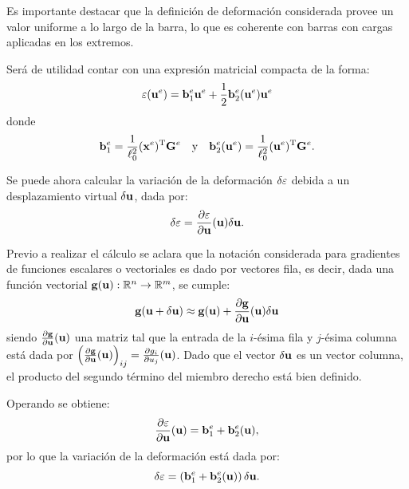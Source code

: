 Es importante destacar que la definición de deformación considerada provee un valor uniforme a lo largo de la barra, lo que es coherente con barras con cargas aplicadas en los extremos. %
%


Será de utilidad contar con una expresión matricial compacta de la forma:
%
\begin{equation}
\varepsilon ({\bf u}^e) = {\bf b}^e_1 {\bf u}^e +  \frac{1}{2} {\bf b}_{2}^e({\bf u}^e) {\bf u}^e
\end{equation}
%
donde
%
\begin{equation}\label{eqn:exprbs}
{\bf b}^e_1 =  \frac{1}{\ell_0^2} 
({\bf x}^e)^{\text{T}} {\bf G}^e
\quad
\text{y}
\quad
{\bf b}^e_2 ({\bf u}^e) = \frac{1}{\ell_0^2}  ({\bf u}^e)^{\text{T}} {\bf G}^e.
\end{equation}



Se puede ahora calcular la variación de la deformación $\delta\varepsilon$ debida a un desplazamiento virtual $\delta{\bf u}$, dada por:
%
\begin{equation}
\delta \varepsilon =  \frac{\partial \varepsilon}{\partial {\bf u}}({\bf u}) \delta {\bf u}.
\end{equation}

Previo a realizar el cálculo se aclara que la notación considerada para gradientes de funciones escalares o vectoriales es dado por vectores fila, es decir, dada una función vectorial ${\bf g}({\bf u}) :{\mathbb R}^n \rightarrow {\mathbb R}^m $, se cumple:
%
\begin{equation}
{\bf g}({\bf u}+\delta{\bf u}) \approx {\bf g}({\bf u}) + \frac{\partial {\bf g} }{\partial {\bf u}}({\bf u}) \delta {\bf u}
\end{equation}
%
siendo $\frac{\partial {\bf g} }{\partial {\bf u}}({\bf u})$ una matriz tal que la entrada de la $i$-ésima fila y $j$-ésima columna está dada por $ \left( \frac{\partial {\bf g} }{\partial {\bf u}}({\bf u}) \right)_{ij} =  \frac{\partial g_i }{\partial u_j }({\bf u})$. %
%
Dado que el vector $\delta {\bf u}$ es un vector columna, el producto del segundo término del miembro derecho está bien definido.




Operando se obtiene:
%
\begin{equation} \label{eqn:derivepsilon}
\frac{\partial \varepsilon}{\partial {\bf u} }({\bf u})  =  {\bf b}_1^e + {\bf b}_2^e({\bf u}),
\end{equation}
%
por lo que la variación de la deformación está dada por:
%
\begin{equation}\label{eqn:variacionepsilon}
\delta \varepsilon = \left( {\bf b}_1^e + {\bf b}_2^e({\bf u}) \right) \delta {\bf u}.
\end{equation}


